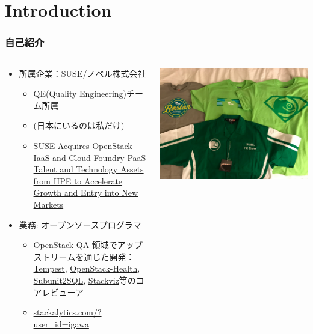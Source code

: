 \documentclass[aspectratio=169,11pt,hyperref={colorlinks=true}]{beamer}
\begin{document}
\section{Introduction}
\begin{frame}
  \frametitle{自己紹介}
  \begin{columns}[T]
    \begin{column}{.5\textwidth}
      \begin{itemize}
        \item 所属企業：SUSE/ノベル株式会社
          \begin{itemize}
            \item QE(Quality Engineering)チーム所属
            \item[] (日本にいるのは私だけ)
            \item \href{https://www.suse.com/newsroom/post/2016/suse-acquires-openstack-iaas-and-cloud-foundry-paas-talent-and-technology-assets-from-hpe-to-accelerate-growth-and-entry-into-new-markets/}{SUSE Acquires OpenStack IaaS and Cloud Foundry PaaS Talent and Technology Assets from HPE to Accelerate Growth and Entry into New Markets}
          \end{itemize}
        \item 業務: オープンソースプログラマ
          \begin{itemize}
            \item \href{https://www.openstack.org/}{OpenStack}
             \href{https://wiki.openstack.org/wiki/QA}{QA} 領域でアップストリームを通じた開発：
             \href{https://docs.openstack.org/developer/tempest/}{Tempest},
             \href{http://status.openstack.org/openstack-health/}{OpenStack-Health},
             \href{https://docs.openstack.org/developer/subunit2sql/}{Subunit2SQL},
             \href{https://docs.openstack.org/developer/stackviz/}{Stackviz}等のコアレビューア
            \item \href{http://stackalytics.com/?user_id=igawa&release=all&metric=all}{stackalytics.com/?user\_id=igawa}
          \end{itemize}
      \end{itemize}
    \end{column}
    \begin{column}{.5\textwidth}
      \includegraphics[width=1.0\textwidth]{suse-t-shirts.jpg}

\end{column}
\end{columns}
\end{frame}
\end{document}
